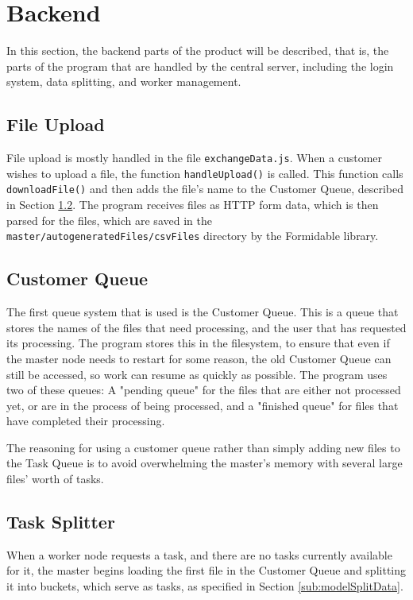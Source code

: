 \section{Backend}
In this section, the backend parts of the product will be described, that is, the parts of the program that are handled by the central server, including the login system, data splitting, and worker management. 

\subsection{File Upload}

File upload is mostly handled in the file \lstinline{exchangeData.js}. When a customer wishes to upload a file, the function \lstinline{handleUpload()} is called. This function calls \lstinline{downloadFile()} and then adds the file's name to the Customer Queue, described in Section \ref{ss:customerQueue}. The program receives files as HTTP form data, which is then parsed for the files, which are saved in the \lstinline{master/autogeneratedFiles/csvFiles} directory by the Formidable library. 
 
\subsection{Customer Queue} \label{ss:customerQueue}
The first queue system that is used is the Customer Queue. This is a queue that stores the names of the files that need processing, and the user that has requested its processing. The program stores this in the filesystem, to ensure that even if the master node needs to restart for some reason, the old Customer Queue can still be accessed, so work can resume as quickly as possible. The program uses two of these queues: A "pending queue" for the files that are either not processed yet, or are in the process of being processed, and a "finished queue" for files that have completed their processing.

The reasoning for using a customer queue rather than simply adding new files to the Task Queue is to avoid overwhelming the master's memory with several large files' worth of tasks.


\subsection{Task Splitter} \label{sub:taskSplitter}
When a worker node requests a task, and there are no tasks currently available for it, the master begins loading the first file in the Customer Queue and splitting it into buckets, which serve as tasks, as specified in Section \ref{sub:modelSplitData}.

